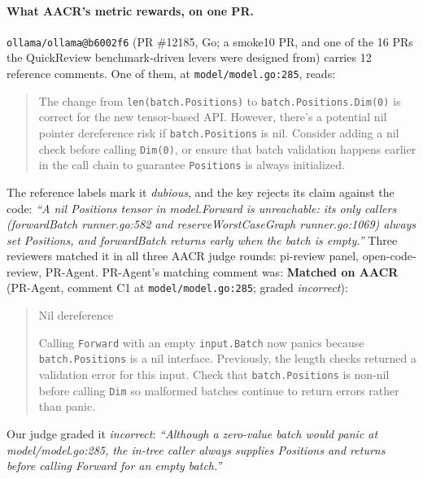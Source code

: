 \documentclass[11pt,a4paper]{article}
\newcommand{\qcr}{QuickReview}
\newcommand{\code}[1]{\texttt{#1}}
\begin{document}
\paragraph{What AACR's metric rewards, on one PR.}
\code{ollama/\allowbreak{}ollama@b6002f6} (PR \#12185, Go; a smoke10 PR, and one of the 16
PRs the \qcr{} benchmark-driven levers were designed from) carries 12 reference comments.
One of them, at \code{model/\allowbreak{}model.go:285}, reads:
\begin{quote}\small
The change from \texttt{len(batch.Positions)} to \texttt{batch.Positions.Dim(0)} is correct for the new tensor-based API. However, there's a potential nil pointer dereference risk if \texttt{batch.Positions} is nil. Consider adding a nil check before calling \texttt{Dim(0)}, or ensure that batch validation happens earlier in the call chain to guarantee \texttt{Positions} is always initialized.
\end{quote}
The reference labels mark it \emph{dubious}, and the key rejects its claim
against the code: \emph{``A nil Positions tensor in model.Forward is unreachable: its only callers (forwardBatch runner.go:582 and reserveWorstCaseGraph runner.go:1069) always set Positions, and forwardBatch returns early when the batch is empty.''}
Three reviewers matched it in all three AACR judge rounds: pi-review panel, open-code-review, PR-Agent.
PR-Agent's matching comment was:
\noindent\textbf{Matched on AACR} (PR-Agent, comment C1 at \code{model/\allowbreak{}model.go:285}; graded \emph{incorrect}):
\begin{quote}\small
Nil dereference\par Calling \texttt{Forward} with an empty \texttt{input.Batch} now panics because \texttt{batch.Positions} is a nil interface. Previously, the length checks returned a validation error for this input. Check that \texttt{batch.Positions} is non-nil before calling \texttt{Dim} so malformed batches continue to return errors rather than panic.
\end{quote}
\noindent Our judge graded it \emph{incorrect}: \emph{``Although a zero-value batch would panic at model/model.go:285, the in-tree caller always supplies Positions and returns before calling Forward for an empty batch.''}
\end{document}
